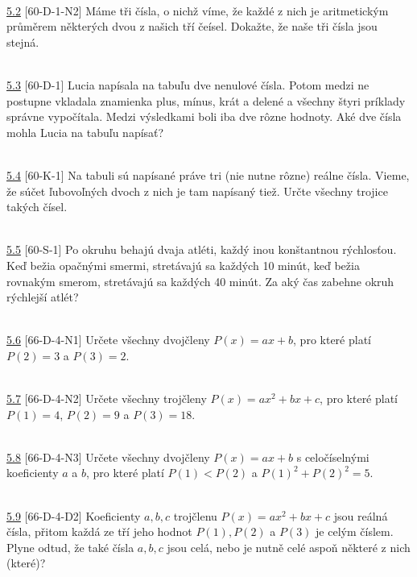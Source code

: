 \\

\noindent \ul{5.2} [60-D-1-N2] Máme tři čísla, o nichž víme, že každé z nich je aritmetickým
průměrem některých dvou z našich tří čeísel. Dokažte, že naše tři čísla jsou stejná.


\\

\noindent \ul{5.3} [60-D-1]
Lucia napísala na tabuľu dve nenulové čísla. Potom medzi ne postupne vkladala znamienka plus, mínus, krát a delené a všechny štyri príklady správne vypočítala. Medzi výsledkami boli iba dve rôzne hodnoty. Aké dve čísla mohla Lucia na tabuľu napísať?


\\

\noindent \ul{5.4} [60-K-1]
Na tabuli sú napísané práve tri (nie nutne rôzne) reálne čísla. Vieme, že súčet ľubovoľných dvoch z nich je tam napísaný tiež. Určte všechny trojice takých čísel.


\\

\noindent \ul{5.5} [60-S-1]
Po okruhu behajú dvaja atléti, každý inou konštantnou rýchlosťou. Keď bežia opačnými smermi, stretávajú sa každých 10 minút, keď bežia rovnakým smerom, stretávajú sa každých 40 minút. Za aký čas zabehne okruh rýchlejší atlét?


\\

\noindent \ul{5.6} [66-D-4-N1] Určete všechny dvojčleny $P (x) = ax + b$, pro které platí $P(2) = 3$
a $P (3) = 2$.


\\

\noindent \ul{5.7} [66-D-4-N2] Určete všechny trojčleny $P (x) = ax^2+ bx + c$, pro které platí $P
(1) = 4$, $P (2) = 9$ a $P (3) = 18$.


\\

\noindent \ul{5.8} [66-D-4-N3] Určete všechny dvojčleny $P (x) = ax+b$ s celočíselnými koeficienty
$a$ a $b$, pro které platí $P (1) < P (2)$ a $P (1)^2+ P(2)^2= 5$.


\\

\noindent \ul{5.9} [66-D-4-D2] Koeficienty $a, b, c$ trojčlenu $P (x) = ax^2+ bx + c$ jsou reálná
čísla, přitom každá ze tří jeho hodnot $P (1), P (2)$ a $P (3)$ je celým číslem. Plyne odtud, že
také čísla $a, b, c$ jsou celá, nebo je nutně celé aspoň některé z nich (které)?


